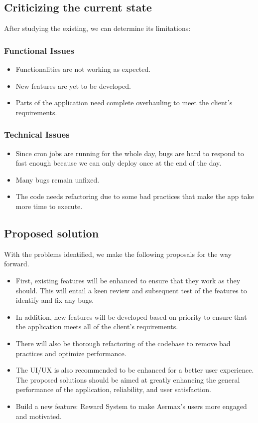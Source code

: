 \subsection{Criticizing the current state}
After studying the existing, we can determine its limitations:

\subsubsection{Functional Issues}
\begin{itemize}
    \item Functionalities are not working as expected.
    \item New features are yet to be developed.
    \item Parts of the application need complete overhauling to meet the client's requirements.
\end{itemize}


\subsubsection{Technical Issues}
\begin{itemize}
    \item Since cron jobs are running for the whole day, bugs are hard to respond to fast enough because we can only deploy once at the end of the day.
    \item Many bugs remain unfixed.
    \item The code needs refactoring due to some bad practices that make the app take more time to execute.
\end{itemize}

\subsection{Proposed solution}
With the problems identified, we make the following proposals for the way forward.

\begin{itemize}
    \item First, existing features will be enhanced to ensure that they work as they should. This will entail a keen review and subsequent test of the features to identify and fix any bugs.
    \item In addition, new features will be developed based on priority to ensure that the application meets all of the client's requirements.
    \item There will also be thorough refactoring of the codebase to remove bad practices and optimize performance.
    \item The UI/UX is also recommended to be enhanced for a better user experience. The proposed solutions should be aimed at greatly enhancing the general performance of the application, reliability, and user satisfaction.
    \item Build a new feature: Reward System to make Aermax's users more engaged and motivated.
\end{itemize}

